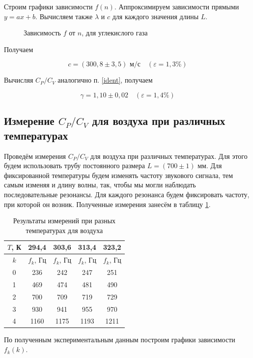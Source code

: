 \documentclass[a4paper,12pt]{article}
\theoremstyle{definition}
\begin{document}
	Строим графики зависимости $ f(n) $. Аппроксимируем зависимости прямыми $ y=ax+b $. 
	Вычисляем также $ \lambda $ и $ c $ для каждого значения длины $L$.
	
	\begin{figure}[h!]
		\centering
		
		\caption{Зависимость $ f $ от $ n $, для углекислого газа}
		\label{graph2}
	\end{figure}
	
	Получаем
 	
	\[ \boxed{c=(300{,}8 \pm 3{,}5)  \text{ м/с}} \quad (\varepsilon=1,3\%)\]
	
	Вычисляя $ C_P/C_V $ аналогично п. \ref{ident}, получаем
	
	\[ \boxed{\gamma = 1,10 \pm 0,02}\quad (\varepsilon=1,4\%) \]
	
	\subsection{Измерение $ C_P/C_V $ для воздуха при различных температурах}
	
	Проведём измерения $ C_P/C_V $ для воздуха при различных температурах. Для этого будем использовать трубу постоянного размера $ L = (700 \pm 1) $ мм. Для фиксированной температуры будем изменять частоту звукового сигнала, тем самым изменяя и длину волны, так, чтобы мы могли наблюдать последовательные резонансы. Для каждого резонанса будем фиксировать частоту, при которой он возник. Полученные измерения занесём в таблицу \ref{tab:constL}.
	
	\begin{table}[H]
		\centering
		\begin{tabular}{|c|c|c|c|c|}
			\hline
			$ T $, К & 294,4 & 303,6 & 313,4 & 323,2  \\ \hline
			$k$ &  $ f_k $, Гц & $ f_k $, Гц &  $ f_k $, Гц & $ f_k $, Гц \\ \hline
			0 & 236 &242 & 247& 251 \\ \hline
			1 & 469 &474 & 481 &490\\ \hline
			2 & 700 & 709 & 719&729 \\ \hline
			3 & 930 & 941 & 955 &970 \\ \hline
			4 & 1160 & 1175& 1193 &1211 \\ \hline
		\end{tabular}
		\caption{Результаты измерений при разных температурах для воздуха}
		\label{tab:constL}
	\end{table}
	
	По полученным экспериментальным данным построим графики зависимости $ f_k(k) $.
	
\end{document}
